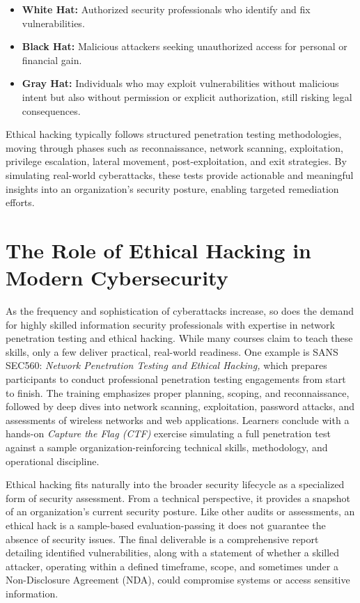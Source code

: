 \begin{itemize}
    \item \textbf{White Hat:} Authorized security professionals who identify and fix vulnerabilities.
    \item \textbf{Black Hat:} Malicious attackers seeking unauthorized access for personal or financial gain.
    \item \textbf{Gray Hat:} Individuals who may exploit vulnerabilities without malicious intent but also without permission or explicit authorization, still risking legal consequences.
\end{itemize}

Ethical hacking typically follows structured penetration testing methodologies, moving through phases such as reconnaissance, network scanning, exploitation, privilege escalation, lateral movement, post-exploitation, and exit strategies. By simulating real-world cyberattacks, these tests provide actionable and meaningful insights into an organization's security posture, enabling targeted remediation efforts.

\section{The Role of Ethical Hacking in Modern Cybersecurity}
As the frequency and sophistication of cyberattacks increase, so does the demand for highly skilled information security professionals with expertise in network penetration testing and ethical hacking. While many courses claim to teach these skills, only a few deliver practical, real-world readiness. One example is SANS SEC560: \textit{Network Penetration Testing and Ethical Hacking,} which prepares participants to conduct professional penetration testing engagements from start to finish. The training emphasizes proper planning, scoping, and reconnaissance, followed by deep dives into network scanning, exploitation, password attacks, and assessments of wireless networks and web applications. Learners conclude with a hands-on \textit{Capture the Flag (CTF)} exercise simulating a full penetration test against a sample organization-reinforcing technical skills, methodology, and operational discipline.

Ethical hacking fits naturally into the broader security lifecycle as a specialized form of security assessment. From a technical perspective, it provides a snapshot of an organization's current security posture. Like other audits or assessments, an ethical hack is a sample-based evaluation-passing it does not guarantee the absence of security issues. The final deliverable is a comprehensive report detailing identified vulnerabilities, along with a statement of whether a skilled attacker, operating within a defined timeframe, scope, and sometimes under a Non-Disclosure Agreement (NDA), could compromise systems or access sensitive information.

